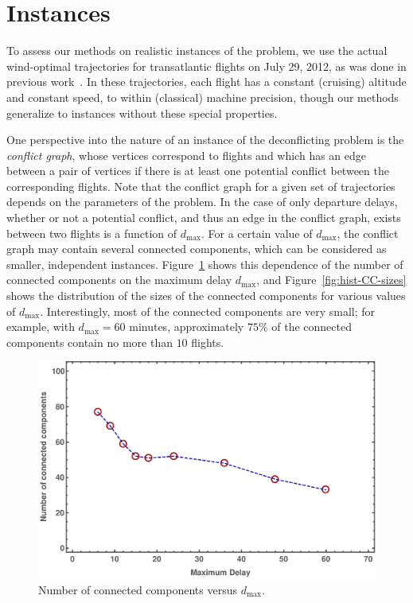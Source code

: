 \section{Instances}\label{sec:instances}
To assess our methods on realistic instances of the problem, we use the actual wind-optimal trajectories for transatlantic flights on July 29, 2012, as was done in previous work~\cite{rodionova16}.
In these trajectories, each flight has a constant (cruising) altitude 
and constant speed, to within (classical) machine precision,
though our methods generalize to instances without these special properties.

One perspective into the nature of an instance of the deconflicting problem is the \emph{conflict graph}, whose vertices correspond to flights and which has an edge between a pair of vertices if there is at least one potential conflict between the corresponding flights.
Note that the conflict graph for a given set of trajectories depends on the parameters of the problem.
In the case of only departure delays, whether or not a potential conflict, and thus an edge in the conflict graph, exists between two flights is a function of $d_{\max}$.
For a certain value of $d_{\max}$, the conflict graph may contain several connected components, which can be considered as smaller, independent instances.
Figure~\ref{fig:num-CCs-vs-dmax} shows this dependence of the number of connected components on the maximum delay $d_{\max}$,
and Figure~\ref{fig:hist-CC-sizes} shows the distribution of the sizes of the connected components for various values of $d_{\max}$.
Interestingly, 
most of the connected components are very small; for example, with $d_{\max}= 60$ minutes, approximately $75\%$ of the connected components contain no more than $10$ flights.

\begin{figure}[h]
\includegraphics[width=\columnwidth]{pics/instances/num_cc.pdf}
\caption[Number of connected components vs. $d_{\max}$]{Number of connected components versus $d_{\max}$.}
\label{fig:num-CCs-vs-dmax}
\end{figure}

